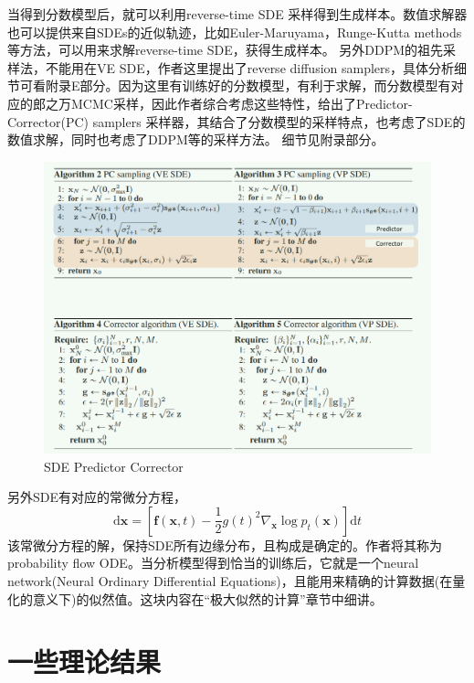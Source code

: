 \documentclass[lang=cn,newtx,10pt,scheme=chinese]{elegantbook}
\begin{document}
当得到分数模型后，就可以利用reverse-time SDE 采样得到生成样本。数值求解器也可以提供来自SDEs的近似轨迹，比如Euler-Maruyama，Runge-Kutta methods等方法，可以用来求解reverse-time SDE，获得生成样本。
另外DDPM的祖先采样法，不能用在VE SDE，作者这里提出了reverse diffusion samplers，具体分析细节可看附录E部分。因为这里有训练好的分数模型，有利于求解，而分数模型有对应的郎之万MCMC采样，因此作者综合考虑这些特性，给出了Predictor-Corrector(PC) samplers 采样器，其结合了分数模型的采样特点，也考虑了SDE的数值求解，同时也考虑了DDPM等的采样方法。
细节见附录部分。
\begin{figure}[h!]
\centering
\includegraphics[scale=0.5]{image/PredictorCorrector.jpg}
\caption{SDE Predictor Corrector}
\label{fig:PC}
\end{figure}

另外SDE有对应的常微分方程，
\begin{equation}
\mathrm{d} \mathbf{x}=\left[\mathbf{f}(\mathbf{x}, t)-\frac{1}{2} g(t)^2 \nabla_{\mathbf{x}} \log p_t(\mathbf{x})\right] \mathrm{d} t
\end{equation}
该常微分方程的解，保持SDE所有边缘分布，且构成是确定的。作者将其称为probability flow ODE。当分析模型得到恰当的训练后，它就是一个neural network(Neural Ordinary Differential Equations)，且能用来精确的计算数据(在量化的意义下)的似然值。这块内容在“极大似然的计算”章节中细讲。

\section{一些理论结果}
\end{document}
